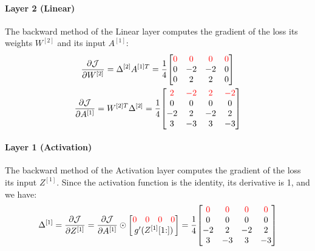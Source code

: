 \paragraph{Layer 2 (Linear)} The backward method of the Linear layer computes the gradient of the loss \wrt its weights $W^{[2]}$ and its input $A^{[1]}$:
\begin{gather*}
    \pdv{\J}{W^{[2]}} = \Delta^{[2]} A^{[1]T} = \frac{1}{4} \mqty[
        \color{red} 0 & \color{red} 0 & \color{red} 0 & \color{red} 0 \\
        0 & -2 & -2 & 0 \\
        0 & 2 & 2 & 0 \\
    ]\\
    \pdv{\J}{A^{[1]}} = W^{[2]T} \Delta^{[2]} = \frac{1}{4} \mqty[
        \color{red} 2 & \color{red} -2 & \color{red} 2 & \color{red} -2 \\
        0 & 0 & 0 & 0 \\
        -2 & 2 & -2 & 2 \\
        3 & -3 & 3 & -3 \\
    ]
\end{gather*}

\paragraph{Layer 1 (Activation)} The backward method of the Activation layer computes the gradient of the loss \wrt its input $Z^{[1]}$. Since the activation function is the identity, its derivative is 1, and we have:
\begin{equation*}
    \Delta^{[1]} = \pdv{\J}{Z^{[1]}} = \pdv{\J}{A^{[1]}} \odot \mqty[
        \mqty{\color{red} 0 & \color{red} 0 & \color{red} 0 & \color{red} 0} \\
        g'(Z^{[1]}[1\hspace{-0.6ex}:])
    ] = \frac{1}{4} \mqty[
        \color{red} 0 & \color{red} 0 & \color{red} 0 & \color{red} 0 \\
        0 & 0 & 0 & 0 \\
        -2 & 2 & -2 & 2 \\
        3 & -3 & 3 & -3 \\
    ]
\end{equation*}

